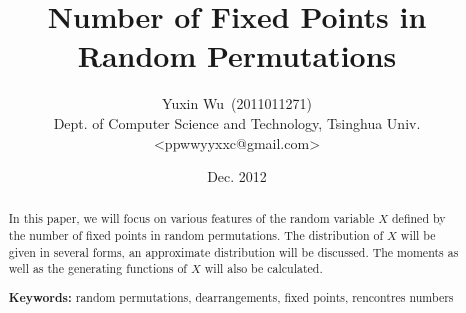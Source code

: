 \documentclass[a4paper]{article}
\title{Number of Fixed Points in Random Permutations}
\author{Yuxin Wu~(2011011271)\\Dept. of Computer Science and Technology, Tsinghua Univ.\\<ppwwyyxxc@gmail.com>}
\date{Dec. 2012}
\begin{document}
\maketitle
\begin{abstract}
  In this paper, we will focus on various features of the random variable $X$
  defined by the number of fixed points in random permutations.
  The distribution of $X$ will be given in several forms, an approximate distribution will be discussed.
  The moments as well as the generating functions of $X$ will also be calculated.

  \textbf{Keywords:} random permutations, dearrangements, fixed points, rencontres numbers
\end{abstract}
\tableofcontents
\newpage







\cite{ideals}
{}

\end{document}
